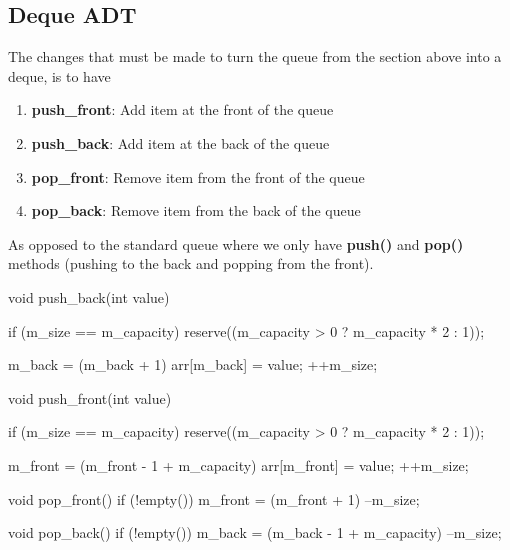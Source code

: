 \documentclass{report}
\begin{document}
     \bigbreak \noindent 
     \subsection{Deque ADT}
     \bigbreak \noindent 
         The changes that must be made to turn the queue from the section above into a deque, is to have
    \begin{enumerate}
        \item \textbf{push\_front}: Add item at the front of the queue
        \item \textbf{push\_back}: Add item at the back of the queue
        \item \textbf{pop\_front}: Remove item from the front of the queue
        \item \textbf{pop\_back}: Remove item from the back of the queue
    \end{enumerate}
    \bigbreak \noindent 
    As opposed to the standard queue where we only have \textbf{push()} and \textbf{pop()} methods (pushing to the back and popping from the front).

    \bigbreak \noindent 
    \begin{cppcode}
    void push_back(int value) {
        if (m_size == m_capacity) {
            reserve((m_capacity > 0 ? m_capacity * 2 : 1));
        }

        m_back = (m_back + 1) %
        arr[m_back] = value;
        ++m_size;
    }

    void push_front(int value) {
        if (m_size == m_capacity) {
            reserve((m_capacity > 0 ? m_capacity * 2 : 1));
        }

        m_front = (m_front - 1 + m_capacity) %
        arr[m_front] = value;
        ++m_size;
    }

    void pop_front() {
        if (!empty()) {
            m_front = (m_front + 1) %
            --m_size;
        }
    }

    void pop_back() {
        if (!empty()) {
            m_back = (m_back - 1 + m_capacity) %
            --m_size;
        }
    }
    \end{cppcode}

    \pagebreak 
\end{document}

